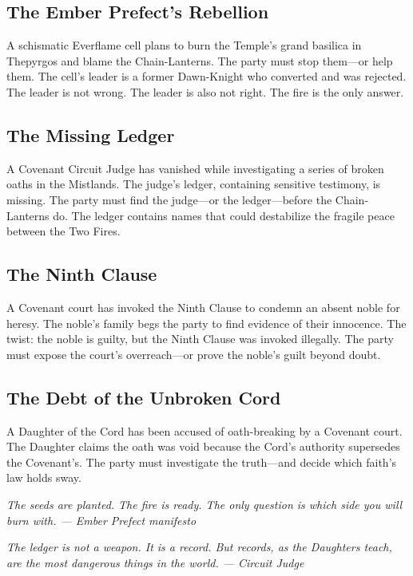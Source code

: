 \documentclass{book}
\newcommand{\citation}[1]{\textcolor{marginalia}{\small\textit{#1}}}
\begin{document}
\subsection{The Ember Prefect's Rebellion}

A schismatic Everflame cell plans to burn the Temple's grand basilica in Thepyrgos and blame the Chain-Lanterns. The party must stop them---or help them. The cell's leader is a former Dawn-Knight who converted and was rejected. The leader is not wrong. The leader is also not right. The fire is the only answer.

\subsection{The Missing Ledger}

A Covenant Circuit Judge has vanished while investigating a series of broken oaths in the Mistlands. The judge's ledger, containing sensitive testimony, is missing. The party must find the judge---or the ledger---before the Chain-Lanterns do. The ledger contains names that could destabilize the fragile peace between the Two Fires.

\subsection{The Ninth Clause}

A Covenant court has invoked the Ninth Clause to condemn an absent noble for heresy. The noble's family begs the party to find evidence of their innocence. The twist: the noble is guilty, but the Ninth Clause was invoked illegally. The party must expose the court's overreach---or prove the noble's guilt beyond doubt.

\subsection{The Debt of the Unbroken Cord}

A Daughter of the Cord has been accused of oath-breaking by a Covenant court. The Daughter claims the oath was void because the Cord's authority supersedes the Covenant's. The party must investigate the truth---and decide which faith's law holds sway.

\citation{The seeds are planted. The fire is ready. The only question is which side you will burn with. --- Ember Prefect manifesto}

\citation{The ledger is not a weapon. It is a record. But records, as the Daughters teach, are the most dangerous things in the world. --- Circuit Judge}
\end{document}
